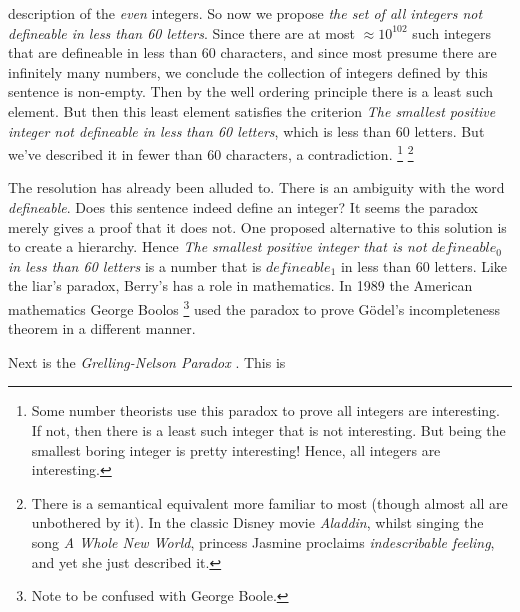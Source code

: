         description of the \textit{even} integers. So now we propose
        \textit{the set of all integers not defineable in less than 60 letters}.
        Since there are at most $\approx{10}^{102}$ such integers that are
        defineable in less than 60 characters, and since most presume there are
        infinitely many numbers, we conclude the collection of integers defined
        by this sentence is non-empty. Then by the well ordering principle there
        is a least such element. But then this least element satisfies the
        criterion \textit{The smallest positive integer not defineable in less}
        \textit{than 60 letters}, which is less than 60 letters. But we've
        described it in fewer than 60 characters, a contradiction.%
        \footnote{%
            Some number theorists use this paradox to prove all integers are
            interesting. If not, then there is a least such integer that is
            not interesting. But being the smallest boring integer is pretty
            interesting! Hence, all integers are interesting.%
        }
        \footnote{%
            There is a semantical equivalent more familiar to most (though
            almost all are unbothered by it). In the classic Disney movie
            \textit{Aladdin}, whilst singing the song
            \textit{A Whole New World}, princess Jasmine proclaims
            \textit{indescribable feeling}, and yet she just described it.
        }
        \par\hfill\par
        The resolution has already been alluded to. There is an ambiguity with
        the word \textit{defineable}. Does this sentence indeed define an
        integer? It seems the paradox merely gives a proof that it does not. One
        proposed alternative to this solution is to create a hierarchy. Hence
        \textit{The smallest positive integer that is not $defineable_{0}$}
        \textit{in less than 60 letters} is a number that is $defineable_{1}$ in
        less than 60 letters. Like the liar's paradox, Berry's has a role in
        mathematics. In 1989 the American mathematics George
        Boolos%
        \footnote{Note to be confused with George Boole.}
        used the paradox to prove G\"{o}del's incompleteness theorem in a
        different manner.
        \par\hfill\par
        Next is the \textit{Grelling-Nelson Paradox}%
        . This is
